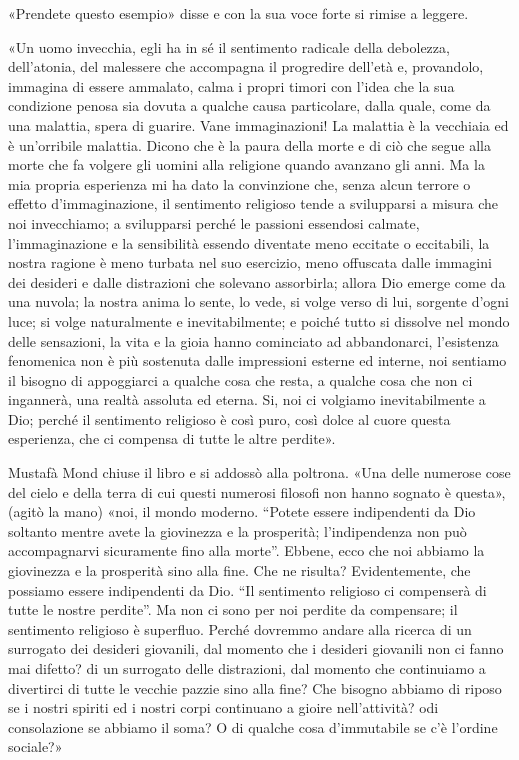 \documentclass[
a5paper, %
10pt, %
twoside, 
onecolumn, %
openany, %
]{memoir}
\begin{document}
«Prendete questo esempio» disse e con la sua voce forte si rimise a leggere.

«Un uomo invecchia, egli ha in sé il sentimento radicale della debolezza, dell’atonia, del malessere che accompagna il progredire dell’età e, provandolo, immagina di essere ammalato, calma i propri timori con l’idea che la sua condizione penosa sia dovuta a qualche causa particolare, dalla quale, come da una malattia, spera di guarire. Vane immaginazioni! La malattia è la vecchiaia ed è un’orribile malattia. Dicono che è la paura della morte e di ciò che segue alla morte che fa volgere gli uomini alla religione quando avanzano gli anni. Ma la mia propria esperienza mi ha dato la convinzione che, senza alcun terrore o effetto d’immaginazione, il sentimento religioso tende a svilupparsi a misura che noi invecchiamo; a svilupparsi perché le passioni essendosi calmate, l’immaginazione e la sensibilità essendo diventate meno eccitate o eccitabili, la nostra ragione è meno turbata nel suo esercizio, meno offuscata dalle immagini dei desideri e dalle distrazioni che solevano assorbirla; allora Dio emerge come da una nuvola; la nostra anima lo sente, lo vede, si volge verso di lui, sorgente d’ogni luce; si volge naturalmente e inevitabilmente; e poiché tutto si dissolve nel mondo delle sensazioni, la vita e la gioia hanno cominciato ad abbandonarci, l’esistenza fenomenica non è più sostenuta dalle impressioni esterne ed interne, noi sentiamo il bisogno di appoggiarci a qualche cosa che resta, a qualche cosa che non ci ingannerà, una realtà assoluta ed eterna. Si, noi ci volgiamo inevitabilmente a Dio; perché il sentimento religioso è così puro, così dolce al cuore questa esperienza, che ci compensa di tutte le altre perdite».

Mustafà Mond chiuse il libro e si addossò alla poltrona. «Una delle numerose cose del cielo e della terra di cui questi numerosi filosofi non hanno sognato è questa», (agitò la mano) «noi, il mondo moderno. “Potete essere indipendenti da Dio soltanto mentre avete la giovinezza e la prosperità; l’indipendenza non può accompagnarvi sicuramente fino alla morte”. Ebbene, ecco che noi abbiamo la giovinezza e la prosperità sino alla fine. Che ne risulta? Evidentemente, che possiamo essere indipendenti da Dio. “Il sentimento religioso ci compenserà di tutte le nostre perdite”. Ma non ci sono per noi perdite da compensare; il sentimento religioso è superfluo. Perché dovremmo andare alla ricerca di un surrogato dei desideri giovanili, dal momento che i desideri giovanili non ci fanno mai difetto? di un surrogato delle distrazioni, dal momento che continuiamo a divertirci di tutte le vecchie pazzie sino alla fine? Che bisogno abbiamo di riposo se i nostri spiriti ed i nostri corpi continuano a gioire nell’attività? odi consolazione se abbiamo il soma? O di qualche cosa d’immutabile se c’è l’ordine sociale?»
\end{document}
